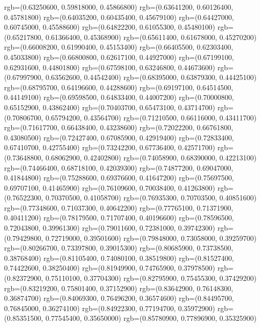 {{{      rgb=(0.63250600, 0.59818000, 0.45866800)
      rgb=(0.63641200, 0.60126400, 0.45781800)
      rgb=(0.64035200, 0.60435400, 0.45679100)
      rgb=(0.64427000, 0.60745000, 0.45588600)
      rgb=(0.64822200, 0.61055300, 0.45480100)
      rgb=(0.65217800, 0.61366400, 0.45368900)
      rgb=(0.65611400, 0.61678000, 0.45270200)
      rgb=(0.66008200, 0.61990400, 0.45153400)
      rgb=(0.66405500, 0.62303400, 0.45033800)
      rgb=(0.66800800, 0.62617100, 0.44927000)
      rgb=(0.67199100, 0.62931600, 0.44801800)
      rgb=(0.67598100, 0.63246800, 0.44673600)
      rgb=(0.67997900, 0.63562600, 0.44542400)
      rgb=(0.68395000, 0.63879300, 0.44425100)
      rgb=(0.68795700, 0.64196600, 0.44288600)
      rgb=(0.69197100, 0.64514500, 0.44149100)
      rgb=(0.69598500, 0.64833400, 0.44007200)
      rgb=(0.70000800, 0.65152900, 0.43862400)
      rgb=(0.70403700, 0.65473100, 0.43714700)
      rgb=(0.70806700, 0.65794200, 0.43564700)
      rgb=(0.71210500, 0.66116000, 0.43411700)
      rgb=(0.71617700, 0.66438400, 0.43238600)
      rgb=(0.72022200, 0.66761800, 0.43080500)
      rgb=(0.72427400, 0.67085900, 0.42919400)
      rgb=(0.72833400, 0.67410700, 0.42755400)
      rgb=(0.73242200, 0.67736400, 0.42571700)
      rgb=(0.73648800, 0.68062900, 0.42402800)
      rgb=(0.74058900, 0.68390000, 0.42213100)
      rgb=(0.74466400, 0.68718100, 0.42039300)
      rgb=(0.74877200, 0.69047000, 0.41844800)
      rgb=(0.75288600, 0.69376600, 0.41647200)
      rgb=(0.75697500, 0.69707100, 0.41465900)
      rgb=(0.76109600, 0.70038400, 0.41263800)
      rgb=(0.76522300, 0.70370500, 0.41058700)
      rgb=(0.76935300, 0.70703500, 0.40851600)
      rgb=(0.77348600, 0.71037300, 0.40642200)
      rgb=(0.77765100, 0.71371900, 0.40411200)
      rgb=(0.78179500, 0.71707400, 0.40196600)
      rgb=(0.78596500, 0.72043800, 0.39961300)
      rgb=(0.79011600, 0.72381000, 0.39742300)
      rgb=(0.79429800, 0.72719000, 0.39501600)
      rgb=(0.79848000, 0.73058000, 0.39259700)
      rgb=(0.80266700, 0.73397800, 0.39015300)
      rgb=(0.80685900, 0.73738500, 0.38768400)
      rgb=(0.81105400, 0.74080100, 0.38519800)
      rgb=(0.81527400, 0.74422600, 0.38250400)
      rgb=(0.81949900, 0.74765900, 0.37978500)
      rgb=(0.82372900, 0.75110100, 0.37704300)
      rgb=(0.82795900, 0.75455300, 0.37429200)
      rgb=(0.83219200, 0.75801400, 0.37152900)
      rgb=(0.83642900, 0.76148300, 0.36874700)
      rgb=(0.84069300, 0.76496200, 0.36574600)
      rgb=(0.84495700, 0.76845000, 0.36274100)
      rgb=(0.84922300, 0.77194700, 0.35972900)
      rgb=(0.85351500, 0.77545400, 0.35650000)
      rgb=(0.85780900, 0.77896900, 0.35325900)
}}}

